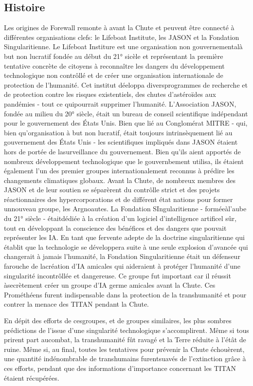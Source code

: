 \subsection{Histoire} 

Les origines de Forewall remonte à avant la Chute et peuvent être connecté à différentes organisations clefs: le Lifeboat Institute, les JASON et la Fondation Singularitienne. Le Lifeboat Institure est une organisation non gouvernementalà but non lucratif fondée au début du 21° sicèle et représentant la première tentative concrète de citoyens à reconnaître les dangers du développement technologique non contrôllé et de créer une organisation internationale de protection de l'humanité. Cet institut déeloppa diversprogrammes de recherche et de protection contre les risques existentiels, des chutes d'astéroïdes aux pandémies - tout ce quipourrait supprimer l'humanité. L'Association JASON, fondée au milieu du 20° siècle, était un bureau de conseil scientifique indépendant pour le gouvernement des États Unis. Bien que lié au Conglomérat MITRE - qui, bien qu'organisation à but non lucratif, était toujours intrinsèquement lié au gouvernement des États Unis - les scientifiques impliqués dans JASON étaient hors de portée de lasurveillance du gouvernement. Bien qu'ils aient apportés de nombreux développement technologique que le gouvernbement utilisa, ils étaient également l'un des premier groupes internationalement reconnus à prédire les changements climatiques globaux. Avant la Chute, de nombreux membres des JASON et de leur soutien se séparèrent du contrôlle strict et des projets réactionnaires des hypercorporations et de différent état nations pour former unnouveau groupe, les Argnoautes. La Fondation SIngularitienne - forméeàl'aube du 21° siècle - étaitdédiée à la création d'un logiciel d'intelligence artificel sûr, tout en développant la conscience des bénéfices et des dangers que pouvait représenter les IA. En tant que fervente adepte de la doctrine singularitienne qui établit que la technologie se développera suite à une seule explosion d'avancée qui changerait à jamais l'humanité, la Fondation Singularitienne était un défenseur farouche de lacréation d'IA amicales qui aideraient à protéger l'humanité d'une singularité incontrôllée et dangereuse. Ce groupe fut important car il réussit àsecrètement créer un groupe d'IA germe amicales avant la Chute. Ces Prométhéens furent indispensable dans la protection de la transhumanité et pour contrer la menace des TITAN pendant la Chute. 

En dépit des efforts de cesgroupes, et de groupes similaires, les plus sombres prédictions de l'issue d'une singularité technologique s'accomplirent. Même si tous prirent part aucombat, la transhumanité fût ravagé et la Terre réduite à l'étât de ruine. Même si, au final, toutes les tentatives pour prévenir la Chute échouèrent, une quantité indénombrable de transhumains furentsuavés de l'extinction grâce à ces efforts, pendant que des informations d'importance concernant les TITAN étaient récupérées. 

